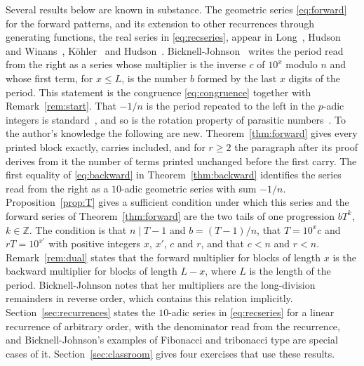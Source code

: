\documentclass[11pt,a4paper]{amsart}
\theoremstyle{definition}
\theoremstyle{remark}
\newcommand{\Z}{\mathbb{Z}}
\begin{document}
Several results below are known in substance. The geometric series \eqref{eq:forward} for the forward patterns, and its extension to other recurrences through generating functions, the real series in \eqref{eq:recseries}, appear in Long~\cite{long1981}, Hudson and Winans~\cite{hudson1981}, K\"ohler~\cite{kohler1985} and Hudson~\cite{hudson1987}. Bicknell-Johnson~\cite{bicknell1989}
writes the period read from the right as a series whose multiplier is the inverse $c$ of $10^x$ modulo $n$ and whose first term, for $x \le L$, is the number $b$ formed by the last $x$ digits of the period. This statement is the congruence \eqref{eq:congruence} together with Remark~\ref{rem:start}. That $-1/n$ is the period repeated to the
left in the $p$-adic integers is standard~\cite{conrad,carlschmitz}, and so is the
rotation property of parasitic numbers~\cite{wiki-parasitic,grinberg}. To the
author's knowledge the following are new. Theorem~\ref{thm:forward} gives every printed block exactly, carries included, and for $r \ge 2$ the paragraph after its proof derives from it the number of terms printed unchanged before the first carry. The first equality of \eqref{eq:backward} in Theorem~\ref{thm:backward} identifies the series read from the right as a $10$-adic geometric series with sum $-1/n$. Proposition~\ref{prop:T} gives a sufficient condition under which this series and the forward series of Theorem~\ref{thm:forward} are the two tails of one progression $bT^k$, $k \in \Z$. The condition is that $n \mid T - 1$ and $b = (T-1)/n$, that $T = 10^x c$ and $rT = 10^{x'}$ with positive integers $x$, $x'$, $c$ and $r$, and that $c < n$ and $r < n$. Remark~\ref{rem:dual} states that the forward multiplier for blocks of length $x$ is the backward multiplier for blocks of length $L - x$, where $L$ is the length of the period. Bicknell-Johnson notes that her multipliers are the long-division remainders in reverse order, which contains this relation implicitly. Section~\ref{sec:recurrences} states the $10$-adic series in \eqref{eq:recseries} for a linear recurrence of arbitrary order, with the denominator read from the recurrence, and Bicknell-Johnson's examples of Fibonacci and tribonacci type are special cases of it. Section~\ref{sec:classroom} gives four exercises that use these results.
\end{document}
